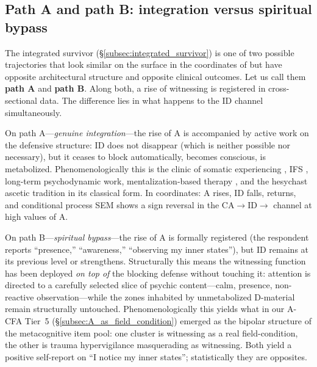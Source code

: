 \subsection{Path A and path B: integration versus spiritual bypass}
\label{subsec:bypass}

The integrated survivor (§\ref{subsec:integrated_survivor}) is one of two possible trajectories that look similar on the surface in the coordinates of \DEIC{} but have opposite architectural structure and opposite clinical outcomes. Let us call them \textbf{path A} and \textbf{path B}. Along both, a rise of witnessing is registered in cross-sectional data. The difference lies in what happens to the ID channel simultaneously.

On path A---\emph{genuine integration}---the rise of A is accompanied by active work on the defensive structure: ID does not disappear (which is neither possible nor necessary), but it ceases to block \EAF{} automatically, becomes conscious, is metabolized. Phenomenologically this is the clinic of somatic experiencing \citep{levine2015}, IFS \citep{schwartz1995}, long-term psychodynamic work, mentalization-based therapy \citep{fonagy2008}, and the hesychast ascetic tradition in its classical form. In \DEIC{} coordinates: A rises, ID falls, \EAF{} returns, and conditional process SEM shows a sign reversal in the CA$\to$ID$\to$\EAF{} channel at high values of A.

On path B---\emph{spiritual bypass}---the rise of A is formally registered (the respondent reports ``presence,'' ``awareness,'' ``observing my inner states''), but ID remains at its previous level or strengthens. Structurally this means the witnessing function has been deployed \emph{on top of} the blocking defense without touching it: attention is directed to a carefully selected slice of psychic content---calm, presence, non-reactive observation---while the zones inhabited by unmetabolized D-material remain structurally untouched. Phenomenologically this yields what in our A-CFA Tier~5 (§\ref{subsec:A_as_field_condition}) emerged as the bipolar structure of the metacognitive item pool: one cluster is witnessing as a real field-condition, the other is trauma hypervigilance masquerading as witnessing. Both yield a positive self-report on ``I notice my inner states''; statistically they are opposites.

